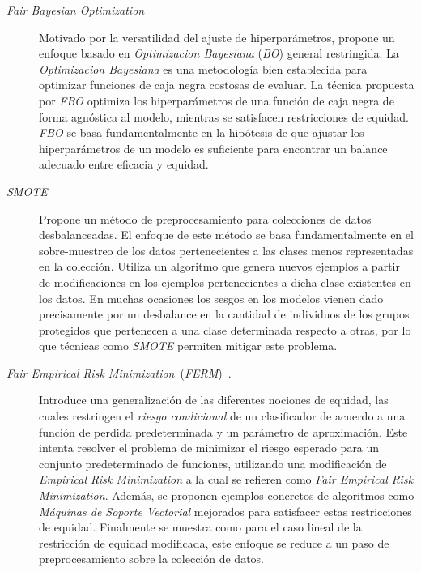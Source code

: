 \begin{description}

\item[\emph{Fair Bayesian Optimization}~\parencite{perrone2021fbo}]
Motivado por la versatilidad del ajuste de hiperparámetros, propone un enfoque basado en \emph{Optimizacion Bayesiana} (\emph{BO}) general restringida.
La \emph{Optimizacion Bayesiana} es una metodología bien establecida para optimizar funciones de caja negra costosas de evaluar.
La técnica propuesta por \emph{FBO} optimiza los hiperparámetros de una función de caja negra de forma agnóstica al modelo, mientras se satisfacen restricciones de equidad.
\emph{FBO} se basa fundamentalmente en la hipótesis de que ajustar los hiperparámetros de un modelo es suficiente para encontrar un balance adecuado entre eficacia y equidad.

\item[\emph{SMOTE} \parencite{chawla2002smote}]
Propone un método de preprocesamiento para colecciones de datos desbalanceadas.
El enfoque de este método se basa fundamentalmente en el sobre-muestreo de los datos pertenecientes a las clases menos representadas en la colección.
Utiliza un algoritmo que genera nuevos ejemplos a partir de modificaciones en los ejemplos pertenecientes a dicha clase existentes en los datos.
En muchas ocasiones los sesgos en los modelos vienen dado precisamente por un desbalance en la cantidad de individuos de los grupos protegidos que pertenecen a una clase determinada respecto a otras, por lo que técnicas como \emph{SMOTE} permiten mitigar este problema.

\item[\emph{Fair Empirical Risk Minimization}~(\emph{FERM})~\parencite{FERM}.]
Introduce una generalización de las diferentes nociones de equidad, las cuales restringen el \emph{riesgo condicional} de un clasificador de acuerdo a una función de perdida predeterminada y un parámetro de aproximación.
Este intenta resolver el problema de minimizar el riesgo esperado para un conjunto predeterminado de funciones, utilizando una modificación de \emph{Empirical Risk Minimization} a la cual se refieren como \emph{Fair Empirical Risk Minimization}.
Además, se proponen ejemplos concretos de algoritmos como \emph{Máquinas de Soporte Vectorial} mejorados para satisfacer estas restricciones de equidad.
Finalmente se muestra como para el caso lineal de la restricción de equidad modificada, este enfoque se reduce a un paso de preprocesamiento sobre la colección de datos. %


\end{description}
